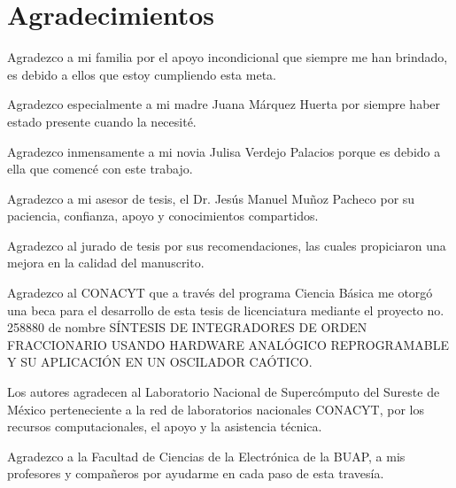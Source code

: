 \chapter{Agradecimientos}

Agradezco a mi familia por el apoyo incondicional que siempre me han brindado, es debido a ellos que estoy cumpliendo esta meta.

Agradezco especialmente a mi madre Juana Márquez Huerta por siempre haber estado presente cuando la necesité.

Agradezco inmensamente a mi novia Julisa Verdejo Palacios porque es debido a ella que comencé con este trabajo.

Agradezco a mi asesor de tesis, el Dr. Jesús Manuel Muñoz Pacheco por su paciencia, confianza, apoyo y conocimientos compartidos.

Agradezco al jurado de tesis por sus recomendaciones, las cuales propiciaron una mejora en la calidad del manuscrito.

Agradezco al CONACYT que a través del programa Ciencia Básica me otorgó una beca para el desarrollo de esta tesis de licenciatura mediante el proyecto no. 258880 de nombre SÍNTESIS DE INTEGRADORES DE ORDEN FRACCIONARIO USANDO HARDWARE ANALÓGICO REPROGRAMABLE Y SU APLICACIÓN EN UN OSCILADOR CAÓTICO.

Los autores agradecen al Laboratorio Nacional de Supercómputo del Sureste de México perteneciente a la red de laboratorios nacionales CONACYT, por los recursos computacionales, el apoyo y la asistencia técnica.

Agradezco a la Facultad de Ciencias de la Electrónica de la BUAP, a mis profesores y compañeros por ayudarme en cada paso de esta travesía.

